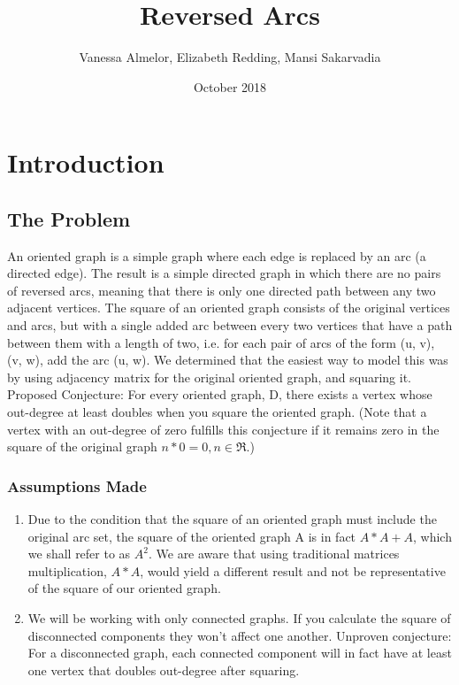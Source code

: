 \documentclass{article}
\title{Reversed Arcs}
\author{Vanessa Almelor, Elizabeth Redding, Mansi Sakarvadia}
\date{October 2018}
\begin{document}
\maketitle

\section{Introduction}

\subsection{The Problem}
\begin{flushleft}

An oriented graph is a simple graph where each edge is replaced by an arc (a directed edge). The result is a simple directed graph in which there are no pairs of reversed arcs, meaning that there is only one directed path between any two adjacent vertices.
\break
\break
The square of an oriented graph consists of the original vertices and arcs, but with a single added arc between every two vertices that have a path between them with a length of two, i.e. for each pair of arcs of the form (u, v), (v, w), add the arc (u, w). We determined that the easiest way to model this was by using adjacency matrix for the original oriented graph, and squaring it.
\break
\break
Proposed Conjecture: For every oriented graph, D, there exists a vertex whose out-degree at least doubles when you square the oriented graph.\break
(Note that a vertex with an out-degree of zero fulfills this conjecture if it remains zero in the square of the original graph \(n*0=0,   n \in \Re\).)

\subsubsection{Assumptions Made}
\begin{enumerate}
\item Due to the condition that the square of an oriented graph must include the original arc set, the square of the oriented graph A is in fact $A*A + A$, which we shall refer to as $A^2$. We are aware that using traditional matrices multiplication, $A*A$, would yield a different result and not be representative of the square of our oriented graph. \break

\item We will be working with only connected graphs. If you calculate the square of disconnected components they won’t affect one another. Unproven conjecture: For a disconnected graph, each connected component will in fact have at least one vertex that doubles out-degree after squaring.  \break
\end{enumerate}
\end{flushleft}
\end{document}

